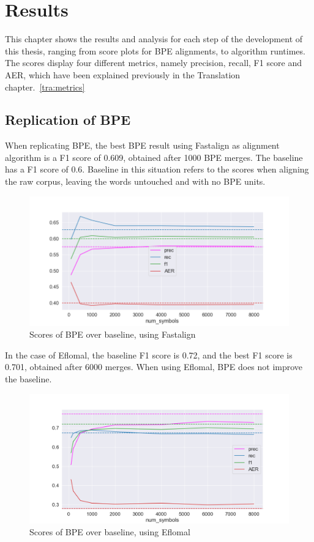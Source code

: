 %
%

\chapter{Results}\label{ch:results}

This chapter shows the results and analysis for each step of the development of this thesis, ranging from score plots for BPE alignments, to algorithm runtimes. The scores display four different metrics, namely precision, recall, F1 score and AER, which have been explained previously in the Translation chapter.~\ref{tra:metrics}

\section{Replication of BPE}

When replicating BPE, the best BPE result using Fastalign as alignment algorithm is a F1 score of 0.609, obtained after 1000 BPE merges. The baseline has a F1 score of 0.6. Baseline in this situation refers to the scores when aligning the raw corpus, leaving the words untouched and with no BPE units.

\begin{figure}[!ht]
    \centering
    \includegraphics[width=12cm]{../reports/scores_normal_bpe/eng_deu_fastalign.png}
    \caption{Scores of BPE over baseline, using Fastalign}
\end{figure}

In the case of Eflomal, the baseline F1 score is 0.72, and the best F1 score is 0.701, obtained after 6000 merges. When using Eflomal, BPE does not improve the baseline.

\begin{figure}[!ht]
    \centering
    \includegraphics[width=12cm]{../reports/scores_normal_bpe/eng_deu_eflomal.png}
    \caption{Scores of BPE over baseline, using Eflomal}
\end{figure}

